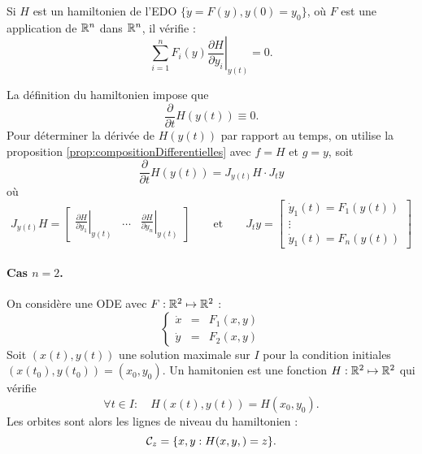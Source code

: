 \bigskip
\begin{proposition}[Hamiltionien] \label{prop:hamiltonien}
  Si $H$ est un hamiltonien de l'EDO $\{\dot y = F(y), y(0) = y_0\}$, où $F$ est une application de $\mathbb{R}^n$ dans $\mathbb{R}^n$, il vérifie :
  $$
  \sum_{i=1}^n F_i(y) \left.\frac{\partial H}{\partial y_i}\right|_{y(t)} = 0.
  $$
\end{proposition}

\proof
  La définition du hamiltonien impose que 
  $$
  \frac{\partial}{\partial t} H(y(t)) \equiv 0.
  $$
  Pour déterminer la dérivée de $H(y(t))$ par rapport au temps, on utilise la proposition \ref{prop:compositionDifferentielles} avec $f = H$ et $g = y$, soit
  $$
  \frac{\partial}{\partial t} H(y(t)) 
  = J_{y(t)}H \cdot J_ty
  $$
  où
  $$
  J_{y(t)}H = \left[ \begin{array}{ccc}
    \displaystyle{\left.\frac{\partial H}{\partial y_1}\right|_{y(t)}} & 
    \dots & 
    \displaystyle{\left.\frac{\partial H}{\partial y_n}\right|_{y(t)}} 
  \end{array}\right] 
  \qquad \text{et} \qquad 
  J_ty = \left[\begin{array}{c} 
    \dot y_1(t) = F_1(y(t)) \\
    \vdots \\
    \dot y_1(t) = F_n(y(t))
  \end{array}\right] 
  $$
\eproof

\paragraph*{Cas $n = 2$.} 
On considère une ODE avec $F : \mathbb{R}^2 \mapsto \mathbb{R}^2$ : 
$$
\left\{\begin{array}{rcl} \dot x & = & F_1(x, y) \\ \dot y & = & F_2(x, y) \end{array}\right.
$$
Soit $(x(t), y(t))$ une solution maximale sur $I$ pour la condition initiales $(x(t_0), y(t_0)) = (x_0, y_0)$. Un hamitonien est une fonction $H : \mathbb{R}^2 \mapsto \mathbb{R}^2$ qui vérifie
$$
\forall t \in I: \quad H(x(t), y(t)) = H(x_0, y_0).
$$
Les orbites sont alors les lignes de niveau du hamiltonien : 
$$
\mathcal{C}_z = \{x, y: H(x, y, ) = z\}.
$$

